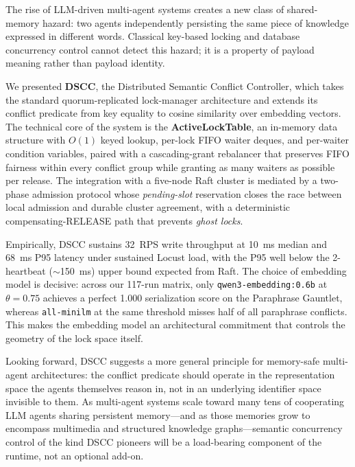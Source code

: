\documentclass[sigconf]{acmart}
\begin{document}
The rise of LLM-driven multi-agent systems creates a new class of
shared-memory hazard: two agents independently persisting the same
piece of knowledge expressed in different words. Classical key-based
locking and database concurrency control cannot detect this hazard;
it is a property of payload meaning rather than payload identity.

We presented \textbf{DSCC}, the Distributed Semantic Conflict
Controller, which takes the standard quorum-replicated lock-manager
architecture and extends its conflict predicate from key equality to
cosine similarity over embedding vectors. The technical core of the
system is the \textbf{ActiveLockTable}, an in-memory data structure
with $O(1)$ keyed lookup, per-lock FIFO waiter deques, and per-waiter
condition variables, paired with a cascading-grant rebalancer that
preserves FIFO fairness within every conflict group while granting as
many waiters as possible per release. The integration with a five-node
Raft cluster is mediated by a two-phase admission protocol whose
\emph{pending-slot} reservation closes the race between local
admission and durable cluster agreement, with a deterministic
compensating-RELEASE path that prevents \emph{ghost locks}.

Empirically, DSCC sustains 32~RPS write throughput at 10~ms median and
68~ms P95 latency under sustained Locust load, with the P95 well
below the 2-heartbeat ($\sim$150~ms) upper bound expected from Raft.
The choice of embedding model is decisive: across our 117-run matrix,
only \texttt{qwen3-embedding:0.6b} at $\theta{=}0.75$ achieves a
perfect 1.000 serialization score on the Paraphrase Gauntlet,
whereas \texttt{all-minilm} at the same threshold misses half of all
paraphrase conflicts. This makes the embedding model an architectural
commitment that controls the geometry of the lock space itself.

Looking forward, DSCC suggests a more general principle for
memory-safe multi-agent architectures: the conflict predicate should
operate in the representation space the agents themselves reason
in, not in an underlying identifier space invisible to them. As
multi-agent systems scale toward many tens of cooperating LLM agents
sharing persistent memory---and as those memories grow to encompass
multimedia and structured knowledge graphs---semantic concurrency
control of the kind DSCC pioneers will be a load-bearing component of
the runtime, not an optional add-on.

\end{document}
